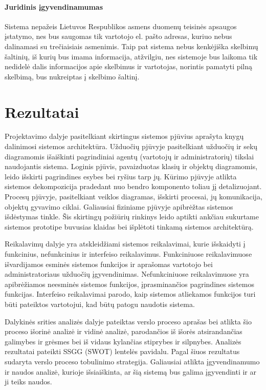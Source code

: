 \documentclass[12pt]{article}
\begin{document}
	\subsection{Juridinis įgyvendinamumas}
	Sistema nepažeis Lietuvos Respublikos asmens duomenų teisinės apsaugos įstatymo, nes bus saugomas tik vartotojo el. pašto adresas, kuriuo nebus dalinamasi su trečiaisiais asmenimis. Taip pat sistema nebus kenkėjiška skelbimų šaltinių, iš kurių bus imama informacija, atžvilgiu, nes sistemoje bus laikoma tik nedidelė dalis informacijos apie skelbimus ir vartotojas, norintis pamatyti pilną skelbimą, bus nukreiptas į skelbimo šaltinį.
	\pagebreak
	
	\part*{Rezultatai}	
	Projektavimo dalyje pasitelkiant skirtingus sistemos pjūvius aprašyta knygų dalinimosi sistemos architektūra. Užduočių pjūvyje pasitelkiant užduočių ir sekų diagramomis išaiškinti pagrindiniai agentų (vartotojų ir administratorių) tikslai naudojantis sistema. Loginis pjūvis, pavaizduotas klasių ir objektų diagramomis, leido išskirti pagrindines esybes bei ryšius tarp jų. Kūrimo pjūvyje atlikta sistemos dekompozicija pradedant nuo bendro komponento toliau jį detalizuojant. Procesų pjūvyje, pasitelkiant veiklos diagramas, išskirti procesai, jų komunikacija, objektų gyvavimo ciklai. Galiausiai fiziniame pjūvyje apibrėžtas sistemos išdėstymas tinkle. Šis skirtingų požiūrių rinkinys leido aptikti ankčiau sukurtame sistemos prototipe buvusias klaidas bei išplėtoti tinkamą sistemos architektūrą.
	
	Reikalavimų dalyje yra atskleidžiami sistemos reikalavimai, kurie išskaidyti į funkcinius, nefunkcinius ir interfeiso reikalavimus. Funkciniuose reikalavimuose išvardijamos esminės sistemos funkcijos ir aprašomas vartotojo bei administratoriaus užduočių įgyvendinimas. Nefunkciniuose reikalavimuose yra apibrėžiamos neesminės sistemos funkcijos, įprasminančios pagrindines sistemos funkcijas. Interfeiso reikalavimai parodo, kaip sistemos atliekamos funkcijos turi būti pateiktos vartotojui, kad būtų patogu naudotis sistema.
	
	Dalykinės srities analizės dalyje pateiktas verslo proceso aprašas bei atlikta šio proceso išorinė analizė ir vidinė analizė, parodančios iš išorės atsirandančias galimybes ir grėsmes bei iš vidaus kylančias stiprybes ir silpnybes. Analizės rezultatai pateikti SSGG (SWOT) lentelės pavidalu. Pagal šiuos rezultatus sudaryta verslo proceso tobulinimo strategija. Galiausiai atlikta įgyvendinamumo ir naudos analizė, kurioje išsiaiškinta, ar šią sistemą bus galima įgyvendinti ir ar ji teiks naudos.
	\pagebreak
	
\end{document}
